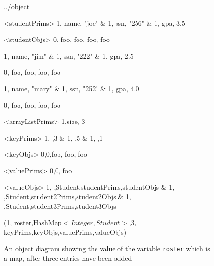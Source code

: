 \documentclass{article}
\begin{document}
\begin {figure}


\Draw

 {../object}


\Indirect \Table <studentPrims>
{ 1, name, "joe" &
  1, ssn, "256"  &
  1, gpa, 3.5  
}

\Indirect \Table <studentObjs>
{ 0, foo, foo, foo, foo }

\Indirect {}
{ 1, name, "jim" &
  1, ssn, "222"  &
  1, gpa, 2.5  
}

\Indirect {}
{ 0, foo, foo, foo, foo }

\Indirect {}
{ 1, name, "mary" &
  1, ssn, "252"  &
  1, gpa, 4.0  
}

\Indirect {}
{ 0, foo, foo, foo, foo }

\Indirect \Table <arrayListPrims>
{1,size, 3}


\Indirect \Table <keyPrims>
 {  1, ,3	&
    1, ,5	& 
    1, ,1	 }
  
\Indirect \Table <keyObjs>
 {  0,0,foo, foo, foo }
  
\Indirect \Table <valuePrims>
 {  0,0, foo }
  
\Indirect \Table <valueObjs>
 {  1, ,Student,studentPrims,studentObjs &
    1, ,Student,student2Prims,student2Objs &
    1, ,Student,student3Prims,student3Objs }
  


\ObjMap (1, roster,HashMap$<Integer {,} Student>$,3, keyPrims,keyObjs,valuePrims,valueObjs)
    
\EndDraw

\caption {An object diagram showing the value of the
variable \texttt {roster} which is a map, after three entries have been
added}

\label {fig:ArrayList3}

\end {figure}
\end{document}
